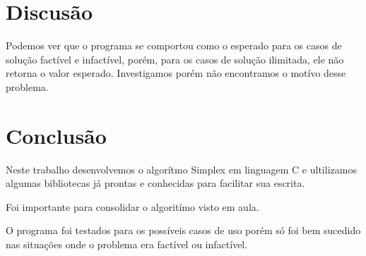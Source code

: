 \documentclass[a4paper]{article}
\begin{document}
\section{Discus\~ao}
Podemos ver que o programa se comportou como o esperado para os casos de solu\c{c}\~ao fact\'ivel e infact\'ivel, por\'em, para os casos de solu\c{c}\~ao ilimitada, ele n\~ao retorna o valor esperado. Investigamos por\'em n\~ao encontramos o mot\'ivo desse problema.

\section{Conclus\~ao}
Neste trabalho desenvolvemos o algor\'itmo Simplex em linguagem C e ultilizamos algumas bibliotecas j\'a prontas e conhecidas para facilitar sua escrita. 

Foi importante para consolidar o algorit\'imo visto em aula. 

O programa foi testados para  os poss\'iveis casos de uso por\'em s\'o foi bem sucedido nas situa\c{c}\~oes onde o problema era fact\'ivel ou infact\'ivel.
\end{document}
